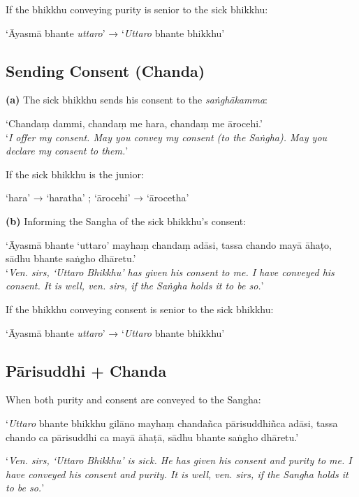 If the bhikkhu conveying purity is senior to the sick bhikkhu:

‘Āyasmā bhante \emph{uttaro}’ → ‘\emph{Uttaro} bhante bhikkhu’


\subsection{Sending Consent (Chanda)}

\textbf{(a)} The sick bhikkhu sends his consent to the \emph{saṅghākamma}:

‘Chandaṃ dammi, chandaṃ me hara, chandaṃ me ārocehi.’\\
‘\emph{I offer my consent. May you convey my consent (to the Saṅgha). May you
  declare my consent to them.}’

If the sick bhikkhu is the junior:

‘hara’ → ‘haratha’ ; ‘ārocehi’ → ‘ārocetha’


\textbf{(b)} Informing the Sangha of the sick bhikkhu's consent:

‘Āyasmā bhante ‘uttaro’ mayhaṃ chandaṃ adāsi, tassa chando mayā āhaṭo, sādhu bhante saṅgho dhāretu.’\\
‘\emph{Ven. sirs, ‘Uttaro Bhikkhu’ has given his consent to me. I have conveyed
  his consent. It is well, ven. sirs, if the Saṅgha holds it to be so.}’

If the bhikkhu conveying consent is senior to the sick bhikkhu:

‘Āyasmā bhante \emph{uttaro}’ → ‘\emph{Uttaro} bhante bhikkhu’


\subsection{Pārisuddhi + Chanda}

When both purity and consent are conveyed to the Sangha:

‘\emph{Uttaro} bhante bhikkhu gilāno mayhaṃ chandañca pārisuddhiñca adāsi, tassa
chando ca pārisuddhi ca mayā āhaṭā, sādhu bhante saṅgho dhāretu.’

‘\emph{Ven. sirs, ‘Uttaro Bhikkhu’ is sick. He has given his consent and purity
  to me. I have conveyed his consent and purity. It is well, ven. sirs, if the
  Sangha holds it to be so.}’


